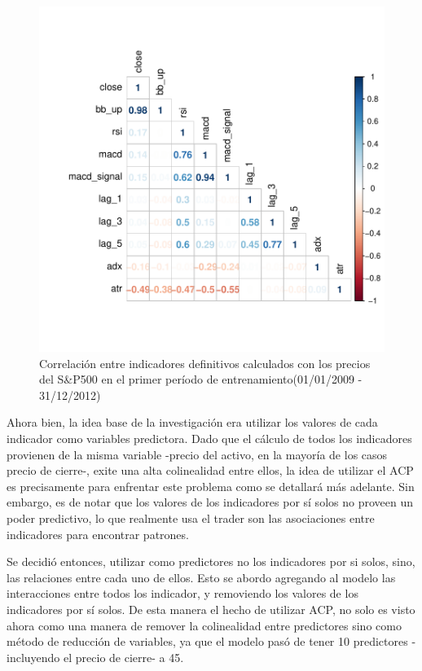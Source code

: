 \documentclass[a4paper,12pt]{Latex/Classes/PhDthesisPSnPDF}
\begin{document}
\begin{figure}[H]
\centering
\includegraphics{main-004}
\caption{Correlación entre indicadores definitivos calculados con los precios del S&P500 en el primer período de entrenamiento(01/01/2009 - 31/12/2012)}
\end{figure}

Ahora bien, la idea base de la investigación era utilizar los valores de cada indicador como variables predictora. Dado que el cálculo de todos los indicadores provienen de la misma variable -precio del activo, en la mayoría de los casos precio de cierre-, exite una alta colinealidad entre ellos, la idea de utilizar el ACP es precisamente para enfrentar este problema como se detallará más adelante. Sin embargo, es de notar que los valores de los indicadores por sí solos no proveen un poder predictivo, lo que realmente usa el trader son las asociaciones entre indicadores para encontrar patrones. 

Se decidió entonces, utilizar como predictores no los indicadores por si solos, sino, las relaciones entre cada uno de ellos. Esto se abordo agregando al modelo las interacciones entre todos los indicador, y removiendo los valores de los indicadores por sí solos. De esta manera el hecho de utilizar ACP, no solo es visto ahora como una manera de remover la colinealidad entre predictores sino como método de reducción de variables, ya que el modelo pasó de tener 10 predictores -incluyendo el precio de cierre- a 45.
\end{document}
